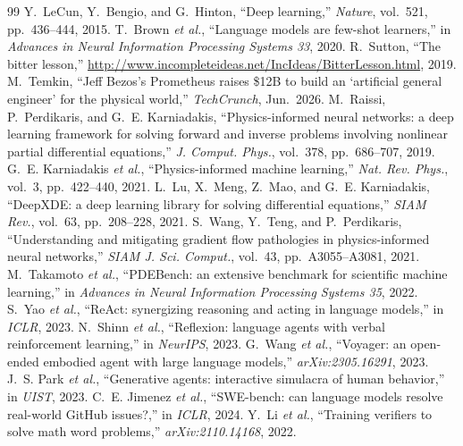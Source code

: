 \documentclass[conference,10pt]{IEEEtran}
\begin{document}
\begin{thebibliography}{99}
 Y.~LeCun, Y.~Bengio, and G.~Hinton, ``Deep learning,''
\emph{Nature}, vol.~521, pp.~436--444, 2015.
 T.~Brown \emph{et al.}, ``Language models are few-shot
learners,'' in \emph{Advances in Neural Information Processing Systems 33},
2020.
 R.~Sutton, ``The bitter lesson,''
\url{http://www.incompleteideas.net/IncIdeas/BitterLesson.html}, 2019.
 M.~Temkin, ``Jeff Bezos's Prometheus raises \$12B
to build an `artificial general engineer' for the physical world,''
\emph{TechCrunch}, Jun.~2026.
 M.~Raissi, P.~Perdikaris, and G.~E. Karniadakis,
``Physics-informed neural networks: a deep learning framework for solving
forward and inverse problems involving nonlinear partial differential
equations,'' \emph{J. Comput. Phys.}, vol.~378, pp.~686--707, 2019.
 G.~E. Karniadakis \emph{et al.}, ``Physics-informed
machine learning,'' \emph{Nat. Rev. Phys.}, vol.~3, pp.~422--440, 2021.
 L.~Lu, X.~Meng, Z.~Mao, and G.~E. Karniadakis,
``DeepXDE: a deep learning library for solving differential equations,''
\emph{SIAM Rev.}, vol.~63, pp.~208--228, 2021.
 S.~Wang, Y.~Teng, and P.~Perdikaris, ``Understanding and
mitigating gradient flow pathologies in physics-informed neural networks,''
\emph{SIAM J. Sci. Comput.}, vol.~43, pp.~A3055--A3081, 2021.
 M.~Takamoto \emph{et al.}, ``PDEBench: an extensive
benchmark for scientific machine learning,'' in \emph{Advances in Neural
Information Processing Systems 35}, 2022.
 S.~Yao \emph{et al.}, ``ReAct: synergizing reasoning and
acting in language models,'' in \emph{ICLR}, 2023.
 N.~Shinn \emph{et al.}, ``Reflexion: language agents
with verbal reinforcement learning,'' in \emph{NeurIPS}, 2023.
 G.~Wang \emph{et al.}, ``Voyager: an open-ended embodied
agent with large language models,'' \emph{arXiv:2305.16291}, 2023.
 J.~S. Park \emph{et al.}, ``Generative agents:
interactive simulacra of human behavior,'' in \emph{UIST}, 2023.
 C.~E. Jimenez \emph{et al.}, ``SWE-bench: can language
models resolve real-world GitHub issues?,'' in \emph{ICLR}, 2024.
 Y.~Li \emph{et al.}, ``Training verifiers to solve math
word problems,'' \emph{arXiv:2110.14168}, 2022.
\end{thebibliography}
\end{document}
